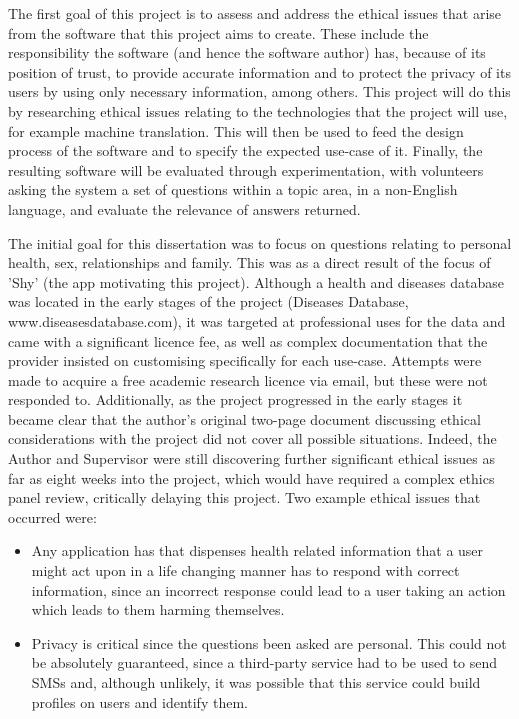 \documentclass{article}
\begin{document}
The first goal of this project is to assess and address the ethical issues that arise from the software that this project aims to create.  These include the responsibility the software (and hence the software author) has, because of its position of trust, to provide accurate information and to protect the privacy of its users by using only necessary information, among others.  This project will do this by researching ethical issues relating to the technologies that the project will use, for example machine translation.  This will then be used to feed the design process of the software and to specify the expected use-case of it.  Finally, the resulting software will be evaluated through experimentation, with volunteers asking the system a set of questions within a topic area, in a non-English language, and evaluate the relevance of answers returned.

The initial goal for this dissertation was to focus on questions relating to personal health, sex, relationships and family.  This was as a direct result of the focus of 'Shy' (the app motivating this project).  Although a health and diseases database was located in the early stages of the project (Diseases Database, www.diseasesdatabase.com), it was targeted at professional uses for the data and came with a significant licence fee, as well as complex documentation that the provider insisted on customising specifically for each use-case.  Attempts were made to acquire a free academic research licence via email, but these were not responded to.  Additionally, as the project progressed in the early stages it became clear that the author's original two-page document discussing ethical considerations with the project did not cover all possible situations.  Indeed, the Author and Supervisor were still discovering further significant ethical issues as far as eight weeks into the project, which would have required a complex ethics panel review, critically delaying this project.  Two example ethical issues that occurred were:

\begin{itemize}
  \item Any application has that dispenses health related information that a user might act upon in a life changing manner has to respond with correct information, since an incorrect response could lead to a user taking an action which leads to them harming themselves.
  \item Privacy is critical since the questions been asked are personal.  This could not be absolutely guaranteed, since a third-party service had to be used to send SMSs and, although unlikely, it was possible that this service could build profiles on users and identify them.
\end{itemize}
\end{document}
